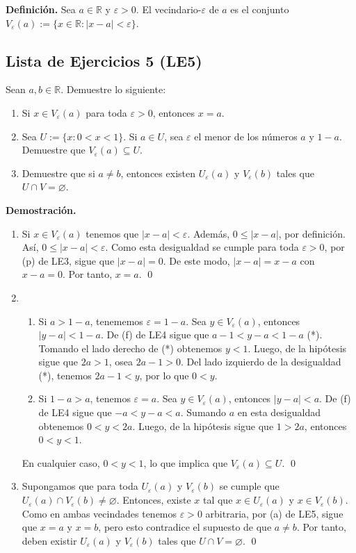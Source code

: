 \documentclass[11pt]{article}
\newcommand{\R}{\mathbb{R}}
\let\epsilon\varepsilon
\let\emptyset\varnothing
\begin{document}
\pagebreak

\textbf{Definición.} Sea $a \in \R$ y $\varepsilon>0$. El vecindario-$\varepsilon$ de $a$ es el conjunto $V_\varepsilon(a):=\{ x\in \R: |x-a|<\varepsilon\}$.

\subsection*{Lista de Ejercicios 5 (LE5)}

Sean $a,b \in \R$. Demuestre lo siguiente:

\begin{enumerate}[label=\alph*)]
    \item Si $x\in V_\varepsilon(a)$ para toda $\varepsilon>0$, entonces $x=a$.
    \item Sea $U:=\{x: 0<x<1\}$. Si $a\in U$, sea $\varepsilon$ el menor de los números $a$ y $1-a$. Demuestre que $V_\varepsilon(a) \subseteq U$.
    \item Demuestre que si $a\neq b$, entonces existen $U_\varepsilon(a)$ y $V_\varepsilon(b)$ tales que $U\cap V =\emptyset$.
\end{enumerate}

\textbf{Demostración.}

\begin{enumerate}[label=\alph*)]
    \item Si $x\in V_\varepsilon(a)$ tenemos que $|x-a|<\varepsilon$. Además, $0\leq |x-a|$, por definición. Así, $0\leq |x-a|<\varepsilon$. Como esta desigualdad se cumple para toda $\varepsilon>0$, por (p) de LE3, sigue que $|x-a|=0$. De este modo, $|x-a|=x-a$ con $x-a=0$. Por tanto, $x=a$. \qed
    
    \item \begin{enumerate}[label=\roman*)]
        \item Si $a>1-a$, tenememos $\varepsilon=1-a$. Sea $y\in V_\varepsilon(a)$, entonces $|y-a|<1-a$. De (f) de LE4 sigue que $a-1<y-a<1-a$ (*). Tomando el lado derecho de (*) obtenemos $y<1$. Luego, de la hipótesis sigue que $2a>1$, osea $2a-1>0$. Del lado izquierdo de la desigualdad (*), tenemos $2a-1<y$, por lo que $0<y$.
        \item Si $1-a>a$, tenemos $\varepsilon=a$. Sea $y\in V_\varepsilon(a)$, entonces $|y-a|<a$. De (f) de LE4 sigue que $-a<y-a<a$. Sumando $a$ en esta desigualdad obtenemos $0<y<2a$. Luego, de la hipótesis sigue que $1>2a$, entonces $0<y<1$.\end{enumerate}
        En cualquier caso, $0<y<1$, lo que implica que $V_\varepsilon(a) \subseteq U$.
        \qed

    \item Supongamos que para toda $U_\varepsilon(a)$ y $V_\varepsilon(b)$ se cumple que $U_\varepsilon(a) \cap V_\varepsilon(b) \neq \emptyset$. Entonces, existe $x$ tal que $x\in U_\varepsilon(a)$ y $x\in V_\varepsilon(b)$. Como en ambas vecindades tenemos $\epsilon>0$ arbitraria, por (a) de LE5, sigue que $x=a$ y $x=b$, pero esto contradice el supuesto de que $a\neq b$. Por tanto, deben existir $U_\varepsilon(a)$ y $V_\varepsilon(b)$ tales que $U\cap V =\emptyset$. \qed
    \end{enumerate}
\end{document}
